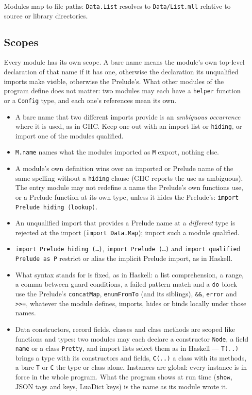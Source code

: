 \documentclass[11pt,a4paper]{article}
\begin{document}
Modules map to file paths: \texttt{Data.List} resolves to
\texttt{Data/List.mll} relative to source or library directories.

\subsection{Scopes}
\label{sec:scopes}

Every module has its own scope.  A bare name means the module's own
top-level declaration of that name if it has one, otherwise the
declaration its unqualified imports make visible, otherwise the
Prelude's.  What other modules of the program define does not matter:
two modules may each have a \texttt{helper} function or a
\texttt{Config} type, and each one's references mean its own.

\begin{itemize}
\item A bare name that two different imports provide is an
  \emph{ambiguous occurrence} where it is used, as in GHC.  Keep one
  out with an import list or \texttt{hiding}, or import one of the
  modules qualified.
\item \texttt{M.name} names what the modules imported as \texttt{M}
  export, nothing else.
\item A module's own definition wins over an imported or Prelude name
  of the same spelling without a \texttt{hiding} clause (GHC reports
  the use as ambiguous).  The entry module may not redefine a name the
  Prelude's own functions use, or a Prelude function at its own type,
  unless it hides the Prelude's:
  \texttt{import Prelude hiding (lookup)}.
\item An unqualified import that provides a Prelude name at a
  \emph{different} type is rejected at the import
  (\texttt{import Data.Map}); import such a module qualified.
\item \texttt{import Prelude hiding (\ldots)},
  \texttt{import Prelude (\ldots)} and
  \texttt{import qualified Prelude as P} restrict or alias the
  implicit Prelude import, as in Haskell.
\item What syntax stands for is fixed, as in Haskell: a list
  comprehension, a range, a comma between guard conditions, a failed
  pattern match and a \texttt{do} block use the Prelude's
  \texttt{concatMap}, \texttt{enumFromTo} (and its siblings),
  \texttt{\&\&}, \texttt{error} and \texttt{>>=}, whatever the module
  defines, imports, hides or binds locally under those names.
\item Data constructors, record fields, classes and class methods are
  scoped like functions and types: two modules may each declare a
  constructor \texttt{Node}, a field \texttt{name} or a class
  \texttt{Pretty}, and import lists select them as in Haskell ---
  \texttt{T(..)} brings a type with its constructors and fields,
  \texttt{C(..)} a class with its methods, a bare \texttt{T} or
  \texttt{C} the type or class alone. Instances are global: every
  instance is in force in the whole program. What the program shows at
  run time (\texttt{show}, JSON tags and keys, LuaDict keys) is the name
  as its module wrote it.
\end{itemize}
\end{document}
